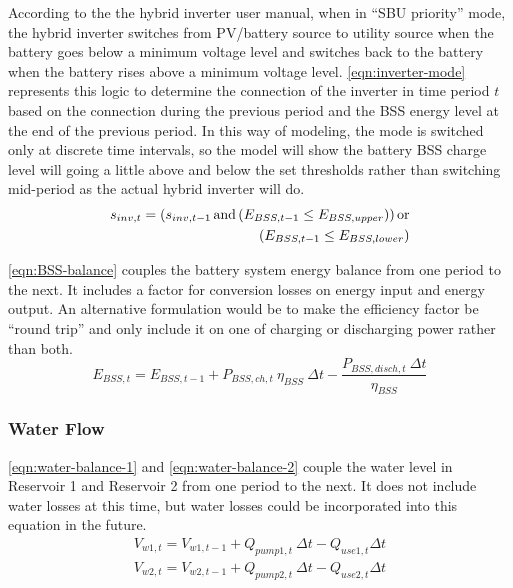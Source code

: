 According to the the hybrid inverter user manual, when in ``SBU priority'' mode, the hybrid inverter switches from PV/battery source to utility source when the battery goes below a minimum voltage level and switches back to the battery when the battery rises above a minimum voltage level. \autoref{eqn:inverter-mode} represents this logic to determine the connection of the inverter in time period $t$ based on the connection during the previous period and the BSS energy level at the end of the previous period. In this way of modeling, the mode is switched only at discrete time intervals, so the model will show the battery BSS charge level will going a little above and below the set thresholds rather than switching mid-period as the actual hybrid inverter will do.
%
\begin{equation}
\label{eqn:inverter-mode}
\begin{split}
s_{inv,t} = \left(s_{inv,t-1} \operatorname{and} \left(E_{BSS,t-1} \le E_{BSS,upper} \right) \right)
\operatorname{or}
\\
\left( E_{BSS,t-1} \le E_{BSS,lower} \right)
\end{split}
\end{equation}

\autoref{eqn:BSS-balance} couples the battery system energy balance from one period to the next. It includes a factor for conversion losses on energy input and energy output. An alternative formulation would be to make the efficiency factor be ``round trip'' and only include it on one of charging or discharging power rather than both.
%
\begin{equation}
\label{eqn:BSS-balance}
E_{BSS,t} = E_{BSS,t-1} + P_{BSS,ch,t} \ \eta_{BSS} \ \Delta t - \frac{P_{BSS,disch,t} \ \Delta t}{\eta_{BSS}}
\end{equation}

\subsubsection{Water Flow}

\autoref{eqn:water-balance-1} and \autoref{eqn:water-balance-2} couple the water level in Reservoir 1 and Reservoir 2 from one period to the next. It does not include water losses at this time, but water losses could be incorporated into this equation in the future.
%
\begin{gather}
\label{eqn:water-balance-1}
V_{w1,t} = V_{w1,t-1} + Q_{pump1,t} \ \Delta t - Q_{use1,t} \Delta t \\
\label{eqn:water-balance-2}
V_{w2,t} = V_{w2,t-1} + Q_{pump2,t} \ \Delta t - Q_{use2,t} \Delta t
\end{gather}

